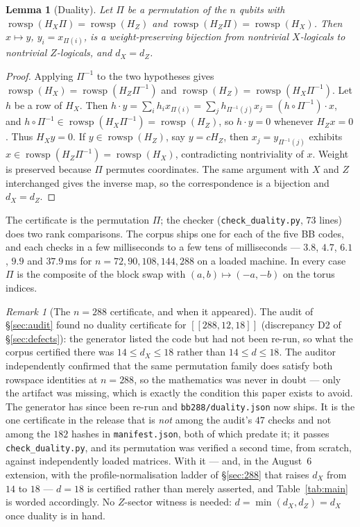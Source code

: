 \documentclass[11pt]{amsart}
\newcommand{\rowsp}{\operatorname{rowsp}}
\newcommand{\HX}{H_{X}}
\newcommand{\HZ}{H_{Z}}
\newcommand{\dX}{d_{X}}
\newcommand{\dZ}{d_{Z}}
\theoremstyle{plain}
\newtheorem{lemma}[theorem]{Lemma}
\theoremstyle{definition}
\theoremstyle{remark}
\newtheorem{remark}[theorem]{Remark}
\begin{document}
\begin{lemma}[Duality]\label{lem:dual}
Let $\Pi$ be a permutation of the $n$ qubits with
$\rowsp(\HX\Pi)=\rowsp(\HZ)$ and $\rowsp(\HZ\Pi)=\rowsp(\HX)$. Then
$x\mapsto y$, $y_{i}=x_{\Pi(i)}$, is a weight-preserving bijection from
nontrivial $X$-logicals to nontrivial $Z$-logicals, and $\dX=\dZ$.
\end{lemma}

\begin{proof}
Applying $\Pi^{-1}$ to the two hypotheses gives
$\rowsp(\HX)=\rowsp(\HZ\Pi^{-1})$ and $\rowsp(\HZ)=\rowsp(\HX\Pi^{-1})$.
Let $h$ be a row of $\HX$. Then $h\cdot y=\sum_{i}h_{i}x_{\Pi(i)}
=\sum_{j}h_{\Pi^{-1}(j)}x_{j}=(h\circ\Pi^{-1})\cdot x$, and
$h\circ\Pi^{-1}\in\rowsp(\HX\Pi^{-1})=\rowsp(\HZ)$, so $h\cdot y=0$ whenever
$\HZ x=0$. Thus $\HX y=0$. If $y\in\rowsp(\HZ)$, say $y=c\HZ$, then
$x_{j}=y_{\Pi^{-1}(j)}$ exhibits $x\in\rowsp(\HZ\Pi^{-1})=\rowsp(\HX)$,
contradicting nontriviality of $x$. Weight is preserved because $\Pi$ permutes
coordinates. The same argument with $X$ and $Z$ interchanged gives the inverse
map, so the correspondence is a bijection and $\dX=\dZ$.
\end{proof}

The certificate is the permutation $\Pi$; the checker
(\texttt{check\_duality.py}, $73$ lines) does two rank comparisons. The corpus
ships one for each of the five BB codes, and each checks in a few milliseconds
to a few tens of milliseconds --- $3.8$, $4.7$, $6.1$, $9.9$ and $37.9$\,ms
for $n=72,90,108,144,288$ on a loaded machine. In every case $\Pi$ is the
composite of the block swap with $(a,b)\mapsto(-a,-b)$ on the torus indices.

\begin{remark}[The $n=288$ certificate, and when it appeared]\label{rem:no288dual}
The audit of \S\ref{sec:audit} found no duality certificate for
$[[288,12,18]]$ (discrepancy D2 of \S\ref{sec:defects}): the generator listed
the code but had not been re-run, so what the corpus certified there was
$14\le\dX\le18$ rather than $14\le d\le18$. The auditor independently
confirmed that the same permutation family does satisfy both rowspace
identities at $n=288$, so the mathematics was never in doubt --- only the
artifact was missing, which is exactly the condition this paper exists to
avoid. The generator has since been re-run and
\texttt{bb288/duality.json} now ships. It is the one certificate in the
release that is \emph{not} among the audit's $47$ checks and not among the
$182$ hashes in \texttt{manifest.json}, both of which predate it; it passes
\texttt{check\_duality.py}, and its permutation was verified a second time,
from scratch, against independently loaded matrices. With it --- and, in the
August~6 extension, with the profile-normalisation ladder of \S\ref{sec:288}
that raises $\dX$ from $14$ to $18$ --- $d=18$ is certified rather than merely
asserted, and Table~\ref{tab:main} is worded accordingly. No $Z$-sector witness
is needed: $d=\min(\dX,\dZ)=\dX$ once duality is in hand.
\end{remark}
\end{document}
